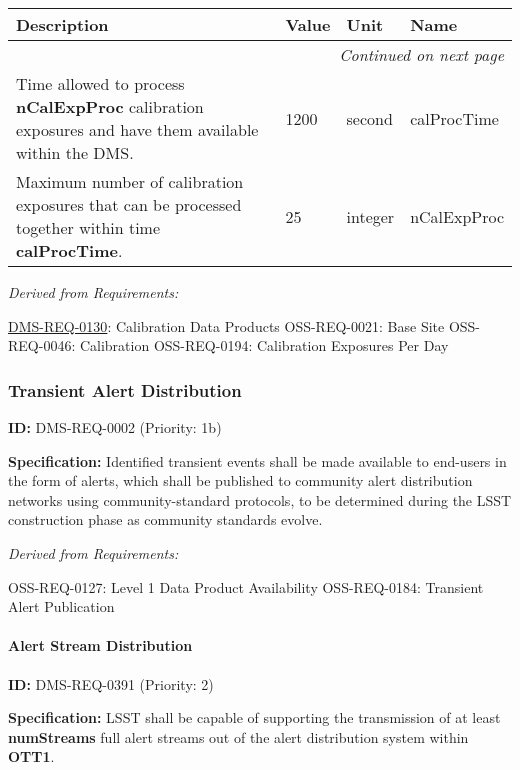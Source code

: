\documentclass[SE,toc,lsstdraft]{lsstdoc}
\makeatletter
\newcommand{\paramname}[1]{\hspace{0pt}#1}
\newcommand{\unitname}[1]{\hspace{0pt}#1}
\newenvironment{parameters}[0]{%
\setlength\LTleft{0pt}
\setlength\LTright{\fill}
\begin{small}
\begin{longtable}[]{|p{0.49\textwidth}|l|p{0.6in}|p{1.70in}@{}|}

\hline \textbf{Description} & \textbf{Value} & \textbf{Unit} & \textbf{Name} \\ \hline
\endhead

\hline \multicolumn{4}{r}{\emph{Continued on next page}} \\
\endfoot

\hline\hline
\endlastfoot
}{%
\hline
\end{longtable}
\end{small}
}
\makeatother
\begin{document}
\begin{parameters}
Time allowed to process \textbf{nCalExpProc} calibration exposures and have them available within the DMS.
&
1200
&
\unitname{%
second
}
&
\paramname{%
calProcTime
} \\\hline

Maximum number of calibration exposures that can be processed together within time \textbf{calProcTime}.

&
25
&
\unitname{%
integer
}
&
\paramname{%
nCalExpProc
} \\\hline
\end{parameters}

\emph{Derived from Requirements:}

\hyperref[DMS-REQ-0130]{DMS-REQ-0130}:
Calibration Data Products \newline
OSS-REQ-0021:
Base Site \newline
OSS-REQ-0046:
Calibration \newline
OSS-REQ-0194:
Calibration Exposures Per Day \newline

\subsubsection{Transient Alert Distribution}

\label{DMS-REQ-0002}
\textbf{ID:} DMS-REQ-0002 (Priority: 1b)

\textbf{Specification:} Identified transient events shall be made available to end-users in the form of alerts, which shall be published to community alert distribution networks using community-standard protocols, to be determined during the LSST construction phase as community standards evolve.

\emph{Derived from Requirements:}

OSS-REQ-0127:
Level 1 Data Product Availability \newline
OSS-REQ-0184:
Transient Alert Publication \newline

\paragraph{Alert Stream Distribution}\hfill  %

\label{DMS-REQ-0391}
\textbf{ID:} DMS-REQ-0391 (Priority: 2)

\textbf{Specification:}
LSST shall be capable of supporting the transmission of at least \textbf{numStreams} full alert streams out of the alert distribution system within \textbf{OTT1}.
\end{document}
